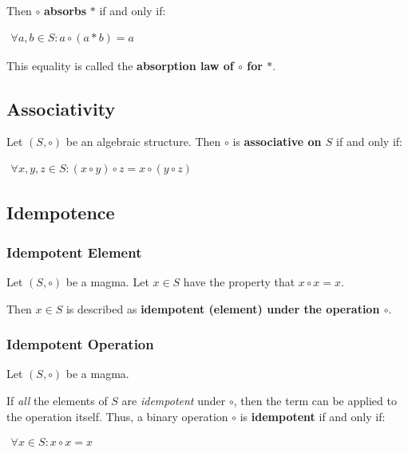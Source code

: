 Then $\circ$ \textbf{absorbs} $*$ if and only if:

\begin{math}
  \begin{array}{c}
    \forall a, b \in S: a \circ (a * b) = a
  \end{array}
\end{math}

This equality is called the \textbf{absorption law of $\circ$ for
  $*$}.



\subsection{Associativity}

Let $(S, \circ)$ be an algebraic structure. Then $\circ$ is
\textbf{associative on $S$} if and only if:

\begin{math}
  \begin{array}{c}
    \forall x, y, z \in S: (x \circ y) \circ z = x \circ (y \circ z)
  \end{array}
\end{math}


\subsection{Idempotence}

\subsubsection{Idempotent Element}
Let $(S, \circ)$ be a magma. Let $x \in S$ have the property that
$ x \circ x = x$.

Then $x \in S $ is described as \textbf{idempotent (element) under the
  operation $\circ$}.

\subsubsection{Idempotent Operation}
Let $(S, \circ)$ be a magma.


If \textit{all} the elements of $S$ are \textit{idempotent} under
$\circ$, then the term can be applied to the operation itself. Thus, a
binary operation $\circ$ is \textbf{idempotent} if and only if:

\begin{math}
  \begin{array}{c}
    \forall x \in S: x \circ x = x
  \end{array}
\end{math}

